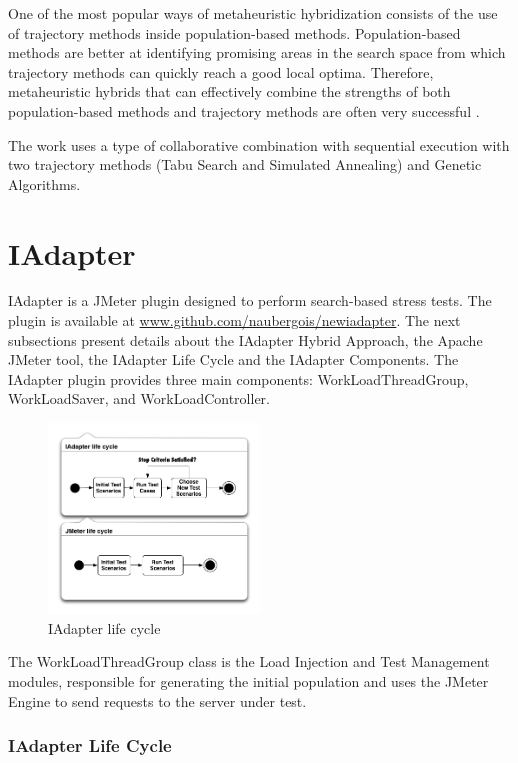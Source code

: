 One of the most popular ways of metaheuristic hybridization consists of the use of trajectory methods inside population-based methods. Population-based methods are better at identifying promising areas in the search space from which trajectory methods can quickly reach a good local optima. Therefore, metaheuristic hybrids that can effectively combine the strengths of both population-based methods and trajectory methods are often very successful \citep{raidl2010metaheuristic}.


The work uses a type of collaborative combination with sequential execution with two trajectory methods (Tabu Search and Simulated Annealing) and Genetic Algorithms.



\section{IAdapter}

IAdapter is a JMeter plugin designed to perform search-based stress tests.  The plugin is available at \url{www.github.com/naubergois/newiadapter}.  The next subsections present details about the IAdapter Hybrid Approach, the Apache JMeter tool, the IAdapter Life Cycle and the IAdapter Components. The IAdapter plugin provides three main components: WorkLoadThreadGroup, WorkLoadSaver, and WorkLoadController.

\begin{figure}[h]
\centering
\includegraphics[width=0.5\textwidth]{./images/lifecycle2.png}
\caption{IAdapter life cycle}
\label{fig:iadapterlifecycle}
\end{figure}

The WorkLoadThreadGroup class is the Load Injection and Test Management modules, responsible for generating the initial population and uses the JMeter Engine to send requests to the server under test. 

\subsubsection{IAdapter Life Cycle}
 
